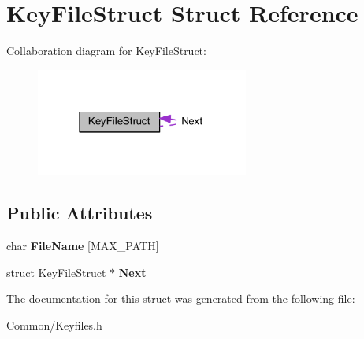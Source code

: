 \hypertarget{struct_key_file_struct}{}\section{Key\+File\+Struct Struct Reference}
\label{struct_key_file_struct}


Collaboration diagram for Key\+File\+Struct\+:
\nopagebreak
\begin{figure}[H]
\begin{center}
\leavevmode
\includegraphics[width=198pt]{struct_key_file_struct__coll__graph}
\end{center}
\end{figure}
\subsection*{Public Attributes}
\begin{DoxyCompactItemize}
\item 
\mbox{\label{struct_key_file_struct_a959323d2dddf460eadc3b2a1553faa9d}} 
char {\bfseries File\+Name} \mbox{[}M\+A\+X\+\_\+\+P\+A\+TH\mbox{]}
\item 
\mbox{\label{struct_key_file_struct_ac4d1df1d67d7b2959b9ffa14e24e8559}} 
struct \hyperlink{struct_key_file_struct}{Key\+File\+Struct} $\ast$ {\bfseries Next}
\end{DoxyCompactItemize}


The documentation for this struct was generated from the following file\+:\begin{DoxyCompactItemize}
\item 
Common/Keyfiles.\+h\end{DoxyCompactItemize}
